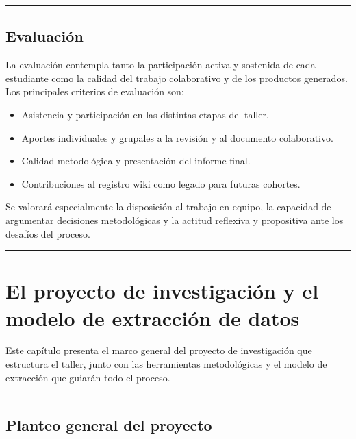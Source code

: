 \documentclass[
  letterpaper,
]{book}
\providecommand{\tightlist}{%
  \setlength{\itemsep}{0pt}\setlength{\parskip}{0pt}}\usepackage{longtable,booktabs,array}
\begin{document}
\begin{center}\rule{0.5\linewidth}{0.5pt}\end{center}

\section{Evaluación}\label{evaluaciuxf3n}

La evaluación contempla tanto la participación activa y sostenida de
cada estudiante como la calidad del trabajo colaborativo y de los
productos generados. Los principales criterios de evaluación son:

\begin{itemize}
\tightlist
\item
  Asistencia y participación en las distintas etapas del taller.
\item
  Aportes individuales y grupales a la revisión y al documento
  colaborativo.
\item
  Calidad metodológica y presentación del informe final.
\item
  Contribuciones al registro wiki como legado para futuras cohortes.
\end{itemize}

Se valorará especialmente la disposición al trabajo en equipo, la
capacidad de argumentar decisiones metodológicas y la actitud reflexiva
y propositiva ante los desafíos del proceso.

\begin{center}\rule{0.5\linewidth}{0.5pt}\end{center}


\chapter{El proyecto de investigación y el modelo de extracción de
datos}\label{el-proyecto-de-investigaciuxf3n-y-el-modelo-de-extracciuxf3n-de-datos}

Este capítulo presenta el marco general del proyecto de investigación
que estructura el taller, junto con las herramientas metodológicas y el
modelo de extracción que guiarán todo el proceso.

\begin{center}\rule{0.5\linewidth}{0.5pt}\end{center}

\section{Planteo general del
proyecto}\label{planteo-general-del-proyecto}
\end{document}
